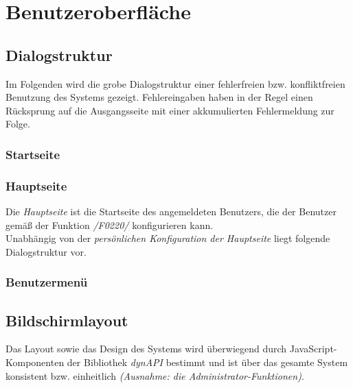 \section{Benutzeroberfläche}


\subsection{Dialogstruktur}

Im Folgenden wird die grobe Dialogstruktur einer fehlerfreien bzw. konfliktfreien Benutzung des Systems gezeigt.
Fehlereingaben haben in der Regel einen Rücksprung auf die Ausgangsseite mit einer akkumulierten Fehlermeldung zur Folge.

\subsubsection{Startseite}


\subsubsection{Hauptseite}

Die \textit{Hauptseite} ist die Startseite des angemeldeten Benutzers, die der Benutzer gemäß der Funktion \textit{/F0220/}
konfigurieren kann.\\
Unabhängig von der \textit{persönlichen Konfiguration der Hauptseite} liegt folgende Dialogstruktur vor.


\subsubsection{Benutzermenü}


\subsection{Bildschirmlayout}

Das Layout sowie das Design des Systems wird überwiegend durch JavaScript-Komponenten der Bibliothek \textit{dynAPI} bestimmt
und ist über das gesamte System konsistent bzw. einheitlich \textit{(Ausnahme: die Administrator-Funktionen)}.

